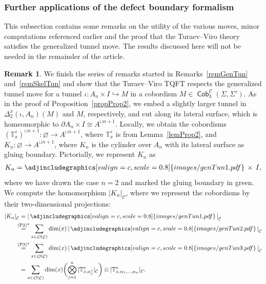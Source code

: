 \documentclass[pdftex]{sigma}
\DeclareMathOperator{\Cob}{\mathsf{Cob}}
\DeclareMathOperator{\calc}{\mathcal{C}}
\DeclareMathOperator{\calo}{\mathcal{O}}
\numberwithin{equation}{section}
\theoremstyle{definition}
\newtheorem{Remark}[Remark]{Remark}
\begin{document}
\subsubsection{Further applications of the defect boundary formalism}
\label{subSecApp}
This subsection contains some remarks on the utility of the various moves, minor computations referenced earlier and the proof that the Turaev--Viro theory satisfies the generalized tunnel move. The results discussed here will not be needed in the remainder of the article.
\begin{Remark}
 We finish the series of remarks started in Remarks~\ref{remGenTun} and~\ref{remSkelTun} and show that the Turaev--Viro TQFT respects the generalized tunnel move for a tunnel $\iota\colon A_n \times I \hookrightarrow M$ in a cobordism $M \in \Cob_3^{\calc}(\Sigma, \Sigma')$. As in the proof of Proposition~\ref{propProp2}, we embed a slightly larger tunnel in $\Delta_2^{x}(\iota, A_n)(M)$ and $M$, respectively, and cut along its lateral surface, which is homeomorphic to $\partial A_n \times I \cong A^{\sqcup n +1}$. Locally, we obtain the cobordisms $(\mathbb{T}_x^s)^{\sqcup n +1}\colon \varnothing \rightarrow A^{\sqcup n+1}$, where $\mathbb{T}_x^s$ is from Lemma~\ref{lemProp2}, and $K_n\colon \varnothing \rightarrow A^{\sqcup n+1}$, where $K_n$ is the cylinder over $A_n$ with its lateral surface as gluing boundary. Pictorially, we represent $K_n$ as
 \begin{align*}
 K_n = \adjincludegraphics[valign=c, scale = 0.8]{images/genTun1.pdf} \, \times \, I,
 \end{align*}
 where we have drawn the case $n = 2$ and marked the gluing boundary in green. We compute the homomorphism $|K_n|_{\calc}$, where we represent the cobordisms by their two-dimensional projections:
 \begin{align*}
 |K_n|_{\calc} & = \left| \, \adjincludegraphics[valign=c, scale = 0.8]{images/genTun1.pdf} \, \right|_{\calc} \\
 &\hspace{-2mm}\overset{\text{(P2)*}}{=} \sum_{x \in \calo(\calc)} \dim(x) \left| \, \adjincludegraphics[valign=c, scale = 0.8]{images/genTun2.pdf} \, \right|_{\calc} \\
 &\hspace{-2mm}\overset{\text{(P3)*}}{=} \sum_{x \in \calo(\calc)}   \dim(x) \left| \, \adjincludegraphics[valign=c, scale = 0.8]{images/genTun3.pdf} \, \right|_{\calc} \\
 & = \sum_{x \in \calo(\calc)}   \dim(x) \biggl(\bigotimes_{j = 1}^n |\mathbb{T}_{x, \alpha_j^*}^s|_{\calc}\biggr) \otimes |\mathbb{T}_{x, \alpha_1, \dots, \alpha_n}^s|_{\calc}.

\end{align*}
\end{Remark}
\end{document}
